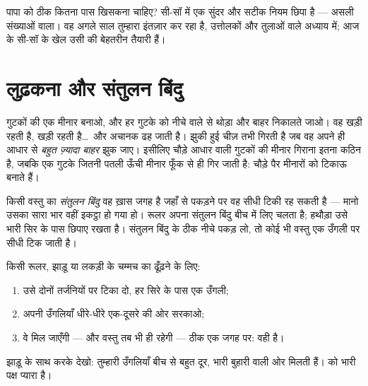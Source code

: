 \begin{remark}[एक वादा]\label{rem:g2:balance-equilibrium:promise}
पापा को ठीक कितना पास खिसकना चाहिए? सी-सॉ में एक सुंदर और सटीक नियम
छिपा है --- असली संख्याओं वाला। वह अगले साल तुम्हारा इंतज़ार कर रहा
है, उत्तोलकों और तुलाओं वाले अध्याय में; आज के सी-सॉ के खेल उसी की
बेहतरीन तैयारी हैं।
\end{remark}

\section{लुढ़कना और संतुलन बिंदु}

\begin{example}[वह मीनार जो ज़्यादा झुक गई]\label{ex:g2:balance-equilibrium:tower}
गुटकों की एक मीनार बनाओ, और हर गुटके को नीचे वाले से थोड़ा और बाहर
निकालते जाओ। वह खड़ी रहती है, खड़ी रहती है\dots\ और अचानक ढह जाती
है। झुकी हुई चीज़ तभी गिरती है जब वह अपने ही आधार से \emph{बहुत
ज़्यादा बाहर} झुक जाए। इसीलिए चौड़े आधार वाली गुटकों की मीनार गिराना
इतना कठिन है, जबकि एक गुटके जितनी पतली ऊँची मीनार फूँक से ही गिर
जाती है: चौड़े पैर मीनारों को टिकाऊ बनाते हैं।
\end{example}

\begin{definition}[संतुलन बिंदु]\label{def:g2:balance-equilibrium:point}
किसी वस्तु का \emph{संतुलन बिंदु} वह ख़ास जगह है
जहाँ से पकड़ने पर वह सीधी टिकी रह सकती है --- मानो उसका सारा भार वहीं
इकट्ठा हो गया हो। रूलर अपना संतुलन बिंदु बीच में लिए चलता है; हथौड़ा
उसे भारी सिर के पास छिपाए रखता है। संतुलन बिंदु के ठीक नीचे पकड़ लो,
तो कोई भी वस्तु एक उँगली पर सीधी टिक जाती है।
\end{definition}

\begin{method}[संतुलन बिंदु ढूँढ़ना]\label{met:g2:balance-equilibrium:find}
किसी रूलर, झाड़ू या लकड़ी के चम्मच का  ढूँढ़ने के लिए:
\begin{enumerate}
  \item उसे दोनों तर्जनियों पर टिका दो, हर सिरे के पास एक उँगली;
  \item अपनी उँगलियाँ धीरे-धीरे एक-दूसरे की ओर सरकाओ;
  \item वे मिल जाएँगी --- और वस्तु तब भी  ही रहेगी --- ठीक
        एक जगह पर: वही  है।
\end{enumerate}
झाड़ू के साथ करके देखो: तुम्हारी उँगलियाँ बीच से बहुत दूर, भारी
बुहारी वाली ओर मिलती हैं।  को भारी पक्ष प्यारा है।
\end{method}

